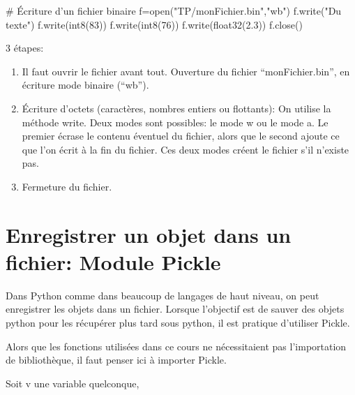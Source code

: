 \documentclass[10pt,fleqn]{article} %
\begin{document}
\begin{minipage}[c]{.39\linewidth}

\begin{py}
\begin{python}[h]
# Écriture d'un fichier binaire
f=open("TP/monFichier.bin","wb")
f.write("Du texte")
f.write(int8(83))
f.write(int8(76))
f.write(float32(2.3))
f.close()
\end{python}
\end{py}

\end{minipage} \hfill
\begin{minipage}[c]{.59\linewidth}
3 étapes:
\begin{enumerate}
\item Il faut ouvrir le fichier avant tout. Ouverture du fichier “monFichier.bin”, en écriture mode binaire (“wb”).
\item Écriture d'octets (caractères, nombres entiers ou flottants): On utilise la méthode write. Deux modes sont possibles: le mode w ou le mode a. Le premier écrase le contenu éventuel du fichier, alors que le second ajoute ce que l'on écrit à la fin du fichier. Ces deux modes créent le fichier s'il n'existe pas.
\item Fermeture du fichier. 
\end{enumerate}
\end{minipage}




\section{Enregistrer un objet dans un fichier: Module Pickle}

Dans Python comme dans beaucoup de langages de haut niveau, on peut enregistrer les objets dans un fichier. 
Lorsque l'objectif est de sauver des objets python pour les récupérer plus tard sous python, il est pratique d'utiliser Pickle.

Alors que les fonctions utilisées dans ce cours ne nécessitaient pas l'importation de bibliothèque, il faut penser ici à importer Pickle.

Soit v une variable quelconque,
\end{document}
